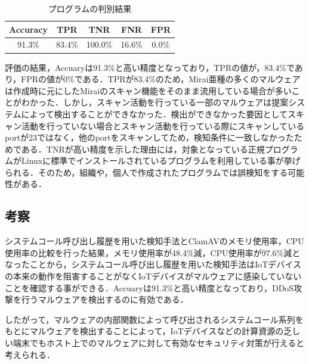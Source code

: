\begin{table}[h]
     \caption{プログラムの判別結果} 
     \label{tab:result}
     \centering 
    \begin{tabular}{|c|c|c|c|c|} \hline 
    Accuracy & TPR    & TNR     & FNR    & FPR   \\ \hline
    91.3\%   & 83.4\% & 100.0\% & 16.6\% & 0.0\% \\ \hline
    \end{tabular}
\end{table}

評価の結果，Accuaryは91.3\%と高い精度となっており，TPRの値が，83.4\%であり，FPRの値が0\%である．TPRが83.4\%のため，Mirai亜種の多くのマルウェアは作成時に元にしたMiraiのスキャン機能をそのまま流用している場合が多いことがわかった．しかし，スキャン活動を行っている一部のマルウェアは提案システムによって検出することができなかった．検出ができなかった要因としてスキャン活動を行っていない場合とスキャン活動を行っている際にスキャンしているportが23ではなく，他のportをスキャンしてため，検知条件に一致しなかったためである．TNRが高い精度を示した理由には，対象となっている正規プログラムがLinuxに標準でインストールされているプログラムを利用している事が挙げられる．そのため，組織や，個人で作成されたプログラムでは誤検知をする可能性がある．

\subsection{考察}
システムコール呼び出し履歴を用いた検知手法とClamAVのメモリ使用率，CPU使用率の比較を行った結果，メモリ使用率が48.4\%減，CPU使用率が97.6\%減となったことから，システムコール呼び出し履歴を用いた検知手法はIoTデバイスの本来の動作を阻害することがなくIoTデバイスがマルウェアに感染していないことを確認する事ができる．Accuaryは91.3\%と高い精度となっており，DDoS攻撃を行うマルウェアを検出するのに有効である．\par
したがって，マルウェアの内部関数によって呼び出されるシステムコール系列をもとにマルウェアを検出することによって，IoTデバイスなどの計算資源の乏しい端末でもホスト上でのマルウェアに対して有効なセキュリティ対策が行えると考えられる．